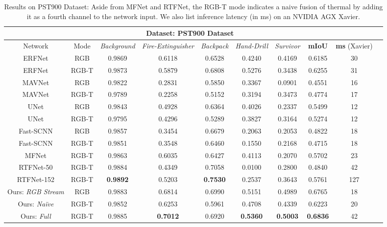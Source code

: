 \documentclass[letterpaper, 10 pt, conference]{ieeeconf}
\begin{document}
\begin{table*}[t]
\centering
\caption{Results on PST900 Dataset: Aside from MFNet and RTFNet, the RGB-T mode indicates a naive fusion of thermal by adding it as a fourth channel to the network input. We also list inference latency (in ms) on an NVIDIA AGX Xavier.}
\vspace{-0.25cm}
\begin{tabular}{|c|c|c|c|c|c|c|c|c|c|}
 \hline
 \multicolumn{9}{|c|}{Dataset: \textbf{PST900 Dataset}} \\
 \hline
 Network & Mode & \textit{Background} & \textit{Fire-Extinguisher} & \textit{Backpack} & \textit{Hand-Drill} & \textit{Survivor} & \textbf{mIoU} & \textbf{ms} (Xavier)\\
 \hline
 ERFNet & RGB & 0.9869 & 0.6118 & 0.6528 & 0.4240 & 0.4169 & 0.6185 & 30\\
 ERFNet & RGB-T & 0.9873 & 0.5879 & 0.6808 & 0.5276 & 0.3438 & 0.6255 & 31\\
 MAVNet & RGB & 0.9822 & 0.2831 & 0.5850 & 0.3367 & 0.0901 & 0.4551 & 16\\
 MAVNet & RGB-T & 0.9789 & 0.2258 & 0.5152 & 0.3194 & 0.3473 & 0.4774 & 17\\
 UNet & RGB & 0.9843 & 0.4928 & 0.6364 & 0.4026 & 0.2337 & 0.5499 & 12\\
 UNet & RGB-T & 0.9795 & 0.4296 & 0.5289 & 0.3827 & 0.3164 & 0.5274 & 12\\
 Fast-SCNN & RGB & 0.9857 & 0.3454 & 0.6679 & 0.2063 & 0.2053 & 0.4822 & 18\\
 Fast-SCNN & RGB-T & 0.9851 & 0.3548 & 0.6460 & 0.1550 & 0.2168 & 0.4715 & 18\\
 MFNet & RGB-T & 0.9863 & 0.6035 & 0.6427 & 0.4113 & 0.2070 & 0.5702 & 23\\
 RTFNet-50 & RGB-T & 0.9884 & 0.4349 & 0.7058 & 0.0100 & 0.2800 & 0.4840 & 42\\ 
 RTFNet-152 & RGB-T & \textbf{0.9892} & 0.5203 & \textbf{0.7530} & 0.2537 & 0.3643 & 0.5761 & 127\\ 
 \hline
 Ours: \textit{RGB Stream} & RGB & 0.9883 & 0.6814 & 0.6990 & 0.5151 & 0.4989 & 0.6765 & 18\\
 Ours: \textit{Na\"ive} & RGB-T & 0.9852 & 0.6253 & 0.5961 & 0.4708 & 0.4339 & 0.6223 & 20\\
 Ours: \textit{Full} & RGB-T & 0.9885 & \textbf{0.7012} & 0.6920 & \textbf{0.5360} & \textbf{0.5003} & \textbf{0.6836} & 42\\
 \hline
\end{tabular}
\label{tab:penn_data}
\end{table*} 
\end{document}
